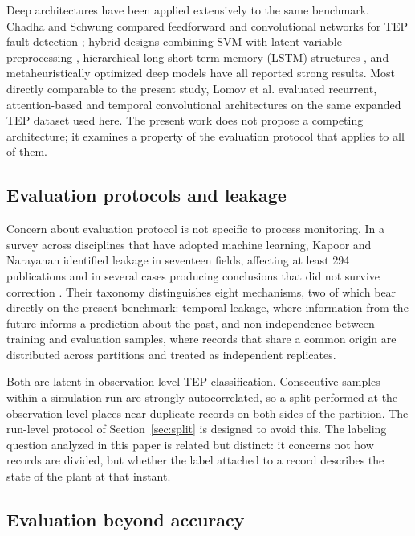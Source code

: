 \documentclass[10pt,twocolumn,a4paper]{article}
\begin{document}
Deep architectures have been applied extensively to the same benchmark. Chadha
and Schwung compared feedforward and convolutional networks for TEP fault
detection \cite{chadha2017comparison}; hybrid designs combining SVM with latent-variable preprocessing \cite{gao2016svm}, hierarchical
long short-term memory (LSTM) structures \cite{agarwal2022lstm}, and metaheuristically optimized deep
models \cite{anitha2023imvoa} have all reported strong results. Most directly
comparable to the present study, Lomov et al. \cite{lomov2021temporal}
evaluated recurrent, attention-based and temporal convolutional architectures
on the same expanded TEP dataset used here. The present work does not propose
a competing architecture; it examines a property of the evaluation protocol
that applies to all of them.

\subsection{Evaluation protocols and leakage}

Concern about evaluation protocol is not specific to process monitoring. In a
survey across disciplines that have adopted machine learning, Kapoor and
Narayanan identified leakage in seventeen fields, affecting at least 294
publications and in several cases producing conclusions that did not survive
correction \cite{kapoor2023leakage}. Their taxonomy distinguishes eight
mechanisms, two of which bear directly on the present benchmark: temporal
leakage, where information from the future informs a prediction about the past,
and non-independence between training and evaluation samples, where records
that share a common origin are distributed across partitions and treated as
independent replicates.

Both are latent in observation-level TEP classification. Consecutive samples
within a simulation run are strongly autocorrelated, so a split performed at
the observation level places near-duplicate records on both sides of the
partition. The run-level protocol of Section~\ref{sec:split} is designed to
avoid this. The labeling question analyzed in this paper is related but
distinct: it concerns not how records are divided, but whether the label
attached to a record describes the state of the plant at that instant.

\subsection{Evaluation beyond accuracy}
\end{document}
